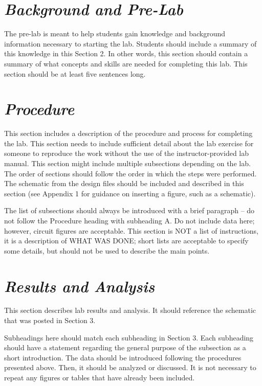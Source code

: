 \documentclass{article}
\begin{document}
\section{\textbf{\textit{Background and Pre-Lab}}}

The pre-lab is meant to help students gain knowledge and background information necessary to starting the lab. Students should include a summary of this knowledge in this Section 2. In other words, this section should contain a summary of what concepts and skills are needed for completing this lab. This section should be at least five sentences long.

\section{\textbf{\textit{Procedure}}}

This section includes a description of the procedure and process for completing the lab. This section needs to include sufficient detail about the lab exercise for someone to reproduce the work without the use of the instructor-provided lab manual. This section might include multiple subsections depending on the lab. The order of sections should follow the order in which the steps were performed. The schematic from the design files should be included and described in this section (see Appendix 1 for guidance on inserting a figure, such as a schematic).

The list of subsections should always be introduced with a brief paragraph – do not follow the Procedure heading with subheading A. Do not include data here; however, circuit figures are acceptable. This section is NOT a list of instructions, it is a description of WHAT WAS DONE; short lists are acceptable to specify some details, but should not be used to describe the main points.

\section{\textbf{\textit{Results and Analysis}}}

This section describes lab results and analysis. It should reference the schematic that was posted in Section 3.

Subheadings here should match each subheading in Section 3. Each subheading should have a statement regarding the general purpose of the subsection as a short introduction. The data should be introduced following the procedures presented above. Then, it should be analyzed or discussed. It is not necessary to repeat any figures or tables that have already been included.
\end{document}
